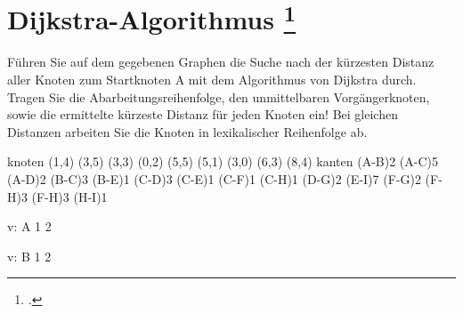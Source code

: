 \documentclass{lehramt-informatik-aufgabe}
\begin{document}

\section{Dijkstra-Algorithmus
\footcite[Aufgabe 4]{aud:e-klausur}
}

Führen Sie auf dem gegebenen Graphen die Suche nach der kürzesten
Distanz aller Knoten zum Startknoten A mit dem Algorithmus von Dijkstra
durch. Tragen Sie die Abarbeitungsreihenfolge, den unmittelbaren
Vorgängerknoten, sowie die ermittelte kürzeste Distanz für jeden Knoten
ein! Bei gleichen Distanzen arbeiten Sie die Knoten in lexikalischer
Reihenfolge ab.

\graph knoten {
  (1,4)
  (3,5)
  (3,3)
  (0,2)
  (5,5)
  (5,1)
  (3,0)
  (6,3)
  (8,4)
} kanten {
  \kante(A-B){2}
  \kante(A-C){5}
  \kante(A-D){2}
  \kante(B-C){3}
  \kante(B-E){1}
  \kante(C-D){3}
  \kante(C-E){1}
  \kante(C-F){1}
  \kante(C-H){1}
  \kante(D-G){2}
  \kante(E-I){7}
  \kante(F-G){2}
  \kante(F-H){3}
  \kante(F-H){3}
  \kante(H-I){1}
}

\begin{liEinfachesGraphenFormat}
v: A 1 2
\end{liEinfachesGraphenFormat}

\begin{liEinfachesGraphenFormat}
v: B 1 2
\end{liEinfachesGraphenFormat}
\end{document}
